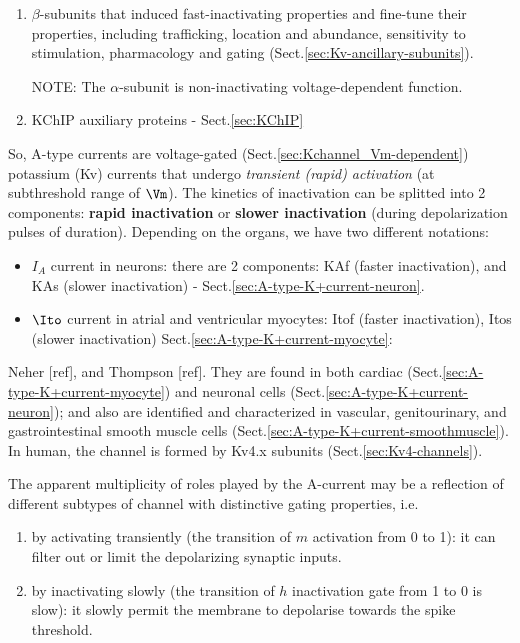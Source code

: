 \begin{enumerate}  
  \item  $\beta$-subunits that induced fast-inactivating properties and
  fine-tune their properties, including trafficking, location and abundance,
  sensitivity to stimulation, pharmacology and gating
  (Sect.\ref{sec:Kv-ancillary-subunits}).
  
  NOTE: The $\alpha$-subunit is non-inactivating voltage-dependent function.
  
  \item KChIP auxiliary proteins - Sect.\ref{sec:KChIP}
\end{enumerate}

So, A-type currents are voltage-gated (Sect.\ref{sec:Kchannel_Vm-dependent})
potassium (Kv) currents that undergo {\it transient (rapid) activation} (at
subthreshold range of $\Vm$). The kinetics of inactivation can be splitted into 2
components: {\bf rapid inactivation} or {\bf slower inactivation} (during
depolarization pulses of duration). Depending on the organs, we have two
different notations:

\begin{itemize}

  \item $I_A$ current in neurons: there are 2 components: KAf (faster
  inactivation), and KAs (slower inactivation) -
  Sect.\ref{sec:A-type-K+current-neuron}.
  
  \item $\Ito$ current in atrial and ventricular myocytes: Itof (faster
  inactivation), Itos (slower
  inactivation) Sect.\ref{sec:A-type-K+current-myocyte}:
\end{itemize}

Neher [ref], and Thompson [ref]. They are found in both cardiac
(Sect.\ref{sec:A-type-K+current-myocyte}) and neuronal cells
(Sect.\ref{sec:A-type-K+current-neuron}); and also are identified and
characterized in vascular, genitourinary, and gastrointestinal smooth muscle
cells (Sect.\ref{sec:A-type-K+current-smoothmuscle}).
In human, the channel is formed by Kv4.x subunits (Sect.\ref{sec:Kv4-channels}).


The apparent multiplicity of roles played by the A-current may be a reflection
of different subtypes of channel with distinctive gating properties, i.e.

\begin{enumerate}

  \item by activating transiently (the transition of $m$ activation from 0 to
  1): it can filter out or limit the depolarizing synaptic inputs.
  
  \item by inactivating slowly (the transition of $h$ inactivation gate
  from 1 to 0 is slow): it slowly permit the membrane to depolarise towards the
  spike threshold. 
\end{enumerate}

